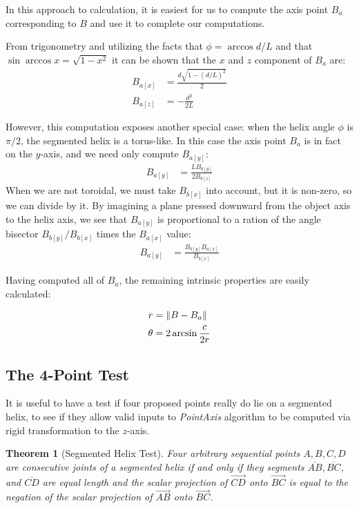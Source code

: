 \documentclass[11pt]{article}
\DeclarePairedDelimiter{\norm}{\lVert}{\rVert}
\newtheorem{theorem}{Theorem}
\begin{document}
{In this approach to calculation, it is easiest for
us to compute the axis point $B_a$ corresponding to $B$ and
use it to complete our computations.

From trigonometry and utilizing the facts that $\phi = \arccos{d/L}$
and that $\sin{\arccos{x}} = \sqrt{1 - x^2}$ it
can be shown that
the $x$ and $z$ component of $B_a$ are:
\begin{align}
  B_{a[x]} &= \frac{d\sqrt{1 - (d/L)^2}}{2} \\
  B_{a[z]} &= -\frac{d^2}{2L}
\end{align}

However, this computation exposes another special case: when the
helix angle $\phi$ is $\pi /2$, the segmented helix is
a torus-like. In this case the axis point $B_a$ is in fact
on the $y$-axis, and we need only compute $B_{a[y]}$:
\begin{align}
  B_{a[y]} &=  \frac{L B_{b[y]}}{2 B_{b[z]}}
\end{align}
When we are not toroidal, we must take $B_{b[x]}$ into
account, but it is non-zero, so we can divide by it.
By imagining a plane pressed downward from the
object axis to the helix axis, we see that $B_{a[y]}$
is proportional to a ration of the angle bisector
$B_{b[y]}/B_{b[x]}$ times the $B_{a[x]}$ value:
\begin{align}
  B_{a[y]} &=  \frac{ B_{b[y]} B_{a[x]}}{ B_{b[x]}}
\end{align}

Having computed all of $B_a$, the remaining intrinsic properties are easily
calculated:

\begin{align}
  r &= \norm{B - B_a}  \\
  \theta &= 2 \arcsin{\frac{c}{2r}} \\
\end{align}


\subsection{The 4-Point Test}

It is useful to have a test if four proposed points really do lie on a segmented helix, to see
if they allow valid inputs to {\em PointAxis} algorithm to be computed via rigid transformation to the $z$-axis.

\begin{theorem}[Segmented Helix Test]
  Four arbitrary sequential points $A,B,C,D$ are consecutive joints of a segmented helix if and only if
  they segments $\overline{AB},\overline{BC}$, and $\overline{CD}$ are equal length and the scalar projection
  of $\overrightarrow{CD}$ onto $\overrightarrow{BC}$ is equal to the negation of the scalar projection of $\overrightarrow{AB}$
  onto $\overrightarrow{BC}$.
\end{theorem}

}
\end{document}
